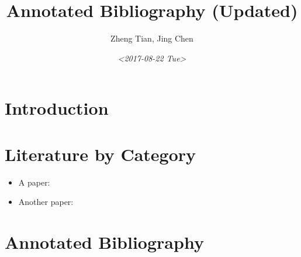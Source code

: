\documentclass[a4paper,11pt]{article}
\author{Zheng Tian, Jing Chen}
\date{\textit{<2017-08-22 Tue>}}
\title{Annotated Bibliography (Updated)}
\begin{document}
\maketitle


\section{Introduction \label{introduction}}
\label{sec:org26b27ab}

\section{Literature by Category \label{lit_category}}
\label{sec:orgfcf6489}

\begin{itemize}
\item A paper: \cite{Simmie2003}
\item Another paper:
\end{itemize}

\section{Annotated Bibliography \label{annotated_bib}}
\label{sec:org8457eae}




\end{document}
